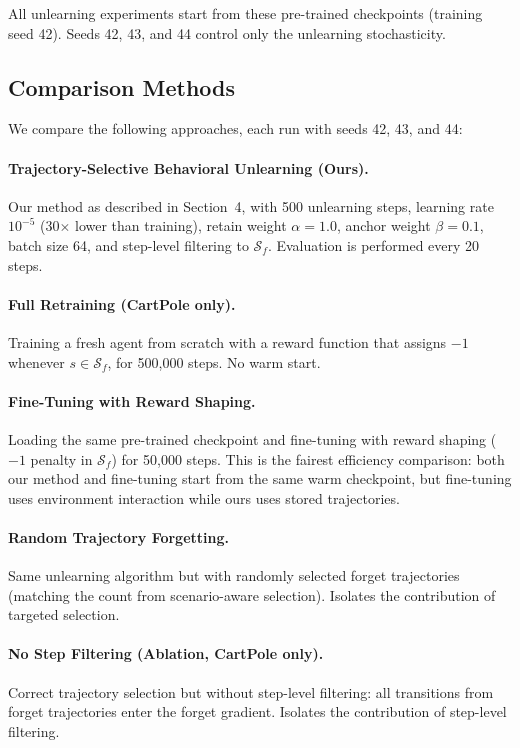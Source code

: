 \documentclass[sigconf]{acmart}
\begin{document}
All unlearning experiments start from these pre-trained checkpoints (training seed 42). Seeds 42, 43, and 44 control only the unlearning stochasticity.

\subsection{Comparison Methods}

We compare the following approaches, each run with seeds 42, 43, and 44:

\paragraph{Trajectory-Selective Behavioral Unlearning (Ours).} Our method as described in Section~4, with 500 unlearning steps, learning rate $10^{-5}$ (30$\times$ lower than training), retain weight $\alpha = 1.0$, anchor weight $\beta = 0.1$, batch size 64, and step-level filtering to $\mathcal{S}_f$. Evaluation is performed every 20 steps.

\paragraph{Full Retraining (CartPole only).} Training a fresh agent from scratch with a reward function that assigns $-1$ whenever $s \in \mathcal{S}_f$, for 500{,}000 steps. No warm start.

\paragraph{Fine-Tuning with Reward Shaping.} Loading the same pre-trained checkpoint and fine-tuning with reward shaping ($-1$ penalty in $\mathcal{S}_f$) for 50{,}000 steps. This is the fairest efficiency comparison: both our method and fine-tuning start from the same warm checkpoint, but fine-tuning uses environment interaction while ours uses stored trajectories.

\paragraph{Random Trajectory Forgetting.} Same unlearning algorithm but with randomly selected forget trajectories (matching the count from scenario-aware selection). Isolates the contribution of targeted selection.

\paragraph{No Step Filtering (Ablation, CartPole only).} Correct trajectory selection but without step-level filtering: all transitions from forget trajectories enter the forget gradient. Isolates the contribution of step-level filtering.
\end{document}
